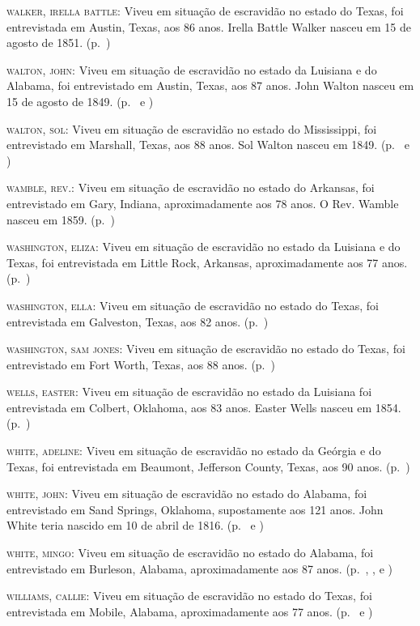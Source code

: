 \begin{Parskip}
\textsc{walker, irella battle:} Viveu em situação de escravidão no estado do Texas, foi
entrevistada em Austin, Texas, aos 86 anos. Irella Battle Walker nasceu
em 15 de agosto de 1851. (p.~\pageref{ref272})

\textsc{walton, john:} Viveu em situação de escravidão no estado da Luisiana e do Alabama, foi
entrevistado em Austin, Texas, aos 87 anos. John Walton nasceu em 15 de
agosto de 1849. (p.~\pageref{ref273} e \pageref{ref274})

\textsc{walton, sol:} Viveu em situação de escravidão no estado do Mississippi, foi entrevistado
em Marshall, Texas, aos 88 anos. Sol Walton nasceu em 1849. (p.~\pageref{ref275} e \pageref{ref276})

\textsc{wamble, rev.:} Viveu em situação de escravidão no estado do Arkansas, foi entrevistado
em Gary, Indiana, aproximadamente aos 78 anos. O Rev. Wamble nasceu em
1859. (p.~\pageref{ref277})

\textsc{washington, eliza:} Viveu em situação de escravidão no estado da Luisiana e do Texas,
foi entrevistada em Little Rock, Arkansas, aproximadamente aos 77 anos. (p.~\pageref{ref278})

\textsc{washington, ella:} Viveu em situação de escravidão no estado do Texas, foi entrevistada
em Galveston, Texas, aos 82 anos. (p.~\pageref{ref279})

\textsc{washington, sam jones:} Viveu em situação de escravidão no estado do Texas, foi
entrevistado em Fort Worth, Texas, aos 88 anos. (p.~\pageref{ref280})

\textsc{wells, easter:} Viveu em situação de escravidão no estado da Luisiana foi entrevistada
em Colbert, Oklahoma, aos 83 anos. Easter Wells nasceu em 1854. (p.~\pageref{ref281})

\textsc{white, adeline:} Viveu em situação de escravidão no estado da Geórgia e do Texas, foi
entrevistada em Beaumont, Jefferson County, Texas, aos 90 anos. (p.~\pageref{ref282})

\textsc{white, john:} Viveu em situação de escravidão no estado do Alabama, foi entrevistado em
Sand Springs, Oklahoma, supostamente aos 121 anos. John White teria
nascido em 10 de abril de 1816. (p.~\pageref{ref283} e \pageref{ref284})

\textsc{white, mingo:} Viveu em situação de escravidão no estado do Alabama, foi entrevistado em
Burleson, Alabama, aproximadamente aos 87 anos. (p.~\pageref{ref285}, \pageref{ref286}, \pageref{ref287} e \pageref{ref288})

\textsc{williams, callie:} Viveu em situação de escravidão no estado do Texas, foi entrevistada
em Mobile, Alabama, aproximadamente aos 77 anos. (p.~\pageref{ref289} e \pageref{ref290})


\end{Parskip}
